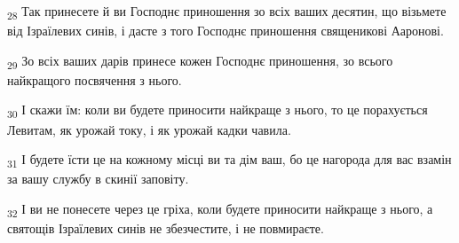 \begin{tcolorbox}
\textsubscript{28} Так принесете й ви Господнє приношення зо всіх ваших десятин, що візьмете від Ізраїлевих синів, і дасте з того Господнє приношення священикові Ааронові.
\end{tcolorbox}
\begin{tcolorbox}
\textsubscript{29} Зо всіх ваших дарів принесе кожен Господнє приношення, зо всього найкращого посвячення з нього.
\end{tcolorbox}
\begin{tcolorbox}
\textsubscript{30} І скажи їм: коли ви будете приносити найкраще з нього, то це порахується Левитам, як урожай току, і як урожай кадки чавила.
\end{tcolorbox}
\begin{tcolorbox}
\textsubscript{31} І будете їсти це на кожному місці ви та дім ваш, бо це нагорода для вас взамін за вашу службу в скинії заповіту.
\end{tcolorbox}
\begin{tcolorbox}
\textsubscript{32} І ви не понесете через це гріха, коли будете приносити найкраще з нього, а святощів Ізраїлевих синів не збезчестите, і не повмираєте.
\end{tcolorbox}
